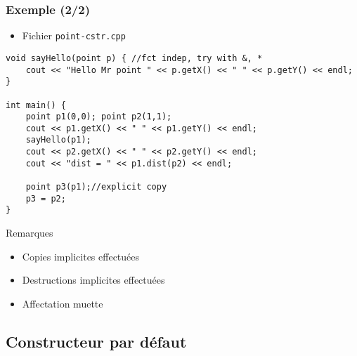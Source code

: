 \begin{frame}[containsverbatim]
\frametitle{Exemple (2/2)}
\begin{itemize}
\item Fichier \texttt{point-cstr.cpp}
\end{itemize}
\begin{lstlisting}
void sayHello(point p) { //fct indep, try with &, * 
	cout << "Hello Mr point " << p.getX() << " " << p.getY() << endl;
}

int main() {
	point p1(0,0); point p2(1,1);
	cout << p1.getX() << " " << p1.getY() << endl;
	sayHello(p1);
	cout << p2.getX() << " " << p2.getY() << endl;
	cout << "dist = " << p1.dist(p2) << endl;
	
	point p3(p1);//explicit copy
	p3 = p2;	
}
\end{lstlisting}
\begin{alertblock}{Remarques}
	\begin{itemize}
	\item Copies implicites effectuées
	\item Destructions implicites effectuées
	\item Affectation muette
	\end{itemize}
\end{alertblock}
\end{frame}

\subsection{Constructeur par défaut}

